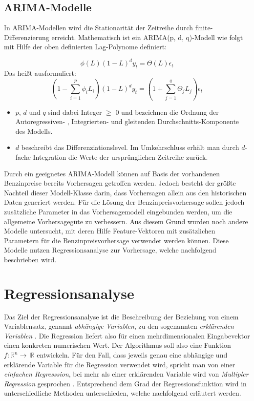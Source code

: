 \documentclass[
ngerman          %
,a4paper          %
,11pt
,pdftex
]{report}
\begin{document}
\subsection{\acf{ARIMA}-Modelle}
In \ac{ARIMA}-Modellen wird die Stationarität der Zeitreihe durch finite-Differenzierung erreicht. Mathematisch ist ein \ac{ARIMA}(p, d, q)-Modell wie folgt mit Hilfe der oben definierten Lag-Polynome definiert:

\begin{equation*}
	\phi(L)(1-L)^d y_t = \Theta(L)\epsilon_t
\end{equation*}
Das heißt ausformuliert:
\begin{equation}
	\left(1-\sum_{i=1}^{p}\phi_i L_i \right) (1-L)^d y_t = \left(1 + \sum_{j=1}^{q} \Theta_j L_j \right) \epsilon_t
\end{equation}

\begin{itemize}
	\item $p$, $d$ und $q$ sind dabei Integer $\geq$ 0 und bezeichnen die Ordnung der Autoregressiven- , Integrierten- und gleitenden Durchschnitts-Komponente des Modells.
	\item $d$ beschreibt das Differenziationslevel. Im Umkehrschluss erhält man durch $d$-fache Integration die Werte der ursprünglichen Zeitreihe zurück.
\end{itemize}

Durch ein geeignetes \ac{ARIMA}-Modell können auf Basis der vorhandenen Benzinpreise bereits Vorhersagen getroffen werden. Jedoch besteht der größte Nachteil dieser Modell-Klasse darin, dass Vorhersagen allein aus den historischen Daten generiert werden. Für die Lösung der Benzinpreisvorhersage sollen jedoch zusätzliche Parameter in das Vorhersagemodell eingebunden werden, um die allgemeine Vorhersagegüte zu verbessern. Aus diesem Grund wurden noch andere Modelle untersucht, mit deren Hilfe Feature-Vektoren mit zusätzlichen Parametern für die Benzinpreisvorhersage verwendet werden können. Diese Modelle nutzen Regressionsanalyse zur Vorhersage, welche nachfolgend beschrieben wird.


\section{Regressionsanalyse}
Das Ziel der Regressionsanalyse ist die Beschreibung der Beziehung von einem Variablensatz, genannt \textit{abhängige Variablen}, zu den sogenannten \textit{erklärenden Variablen} \cite[129]{thinkstats}. Die Regression liefert also für einen mehrdimensionalen Eingabevektor einen konkreten numerischen Wert. Der Algorithmus soll also eine Funktion $f: \mathbb{R}^n \rightarrow\ \mathbb{R}$ entwickeln. Für den Fall, dass jeweils genau eine abhängige und erklärende Variable für die Regression verwendet wird, spricht man von einer \textit{einfachen Regresssion}, bei mehr als einer erklärenden Variable wird von \textit{Multipler Regression} gesprochen \cite[129]{thinkstats}. Entsprechend dem Grad der Regressionsfunktion wird in unterschiedliche Methoden unterschieden, welche nachfolgend erläutert werden.
\end{document}
